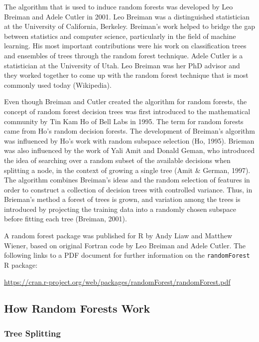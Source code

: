 \documentclass[12pt,twoside]{reedthesis}
\begin{document}
  The algorithm that is used to induce random forests was developed by Leo
  Breiman and Adele Cutler in 2001. Leo Breiman was a distinguished
  statistician at the University of California, Berkeley. Breiman's work
  helped to bridge the gap between statistics and computer science,
  particularly in the field of machine learning. His most important
  contributions were his work on classification trees and ensembles of
  trees through the random forest technique. Adele Cutler is a
  statistician at the University of Utah. Leo Breiman was her PhD advisor
  and they worked together to come up with the random forest technique
  that is most commonly used today (Wikipedia).
  
  Even though Breiman and Cutler created the algorithm for random forests,
  the concept of random forest decision trees was first introduced to the
  mathematical community by Tin Kam Ho of Bell Labs in 1995. The term for
  random forests came from Ho's random decision forests. The development
  of Breiman's algorithm was influenced by Ho's work with random subspace
  selection (Ho, 1995). Brieman was also influenced by the work of Yali
  Amit and Donald Geman, who introduced the idea of searching over a
  random subset of the available decisions when splitting a node, in the
  context of growing a single tree (Amit \& German, 1997). The algorithm
  combines Breiman's ideas and the random selection of features in order
  to construct a collection of decision trees with controlled variance.
  Thus, in Brieman's method a forest of trees is grown, and variation
  among the trees is introduced by projecting the training data into a
  randomly chosen subspace before fitting each tree (Breiman, 2001).
  
  A random forest package was published for R by Andy Liaw and Matthew
  Wiener, based on original Fortran code by Leo Breiman and Adele Cutler.
  The following links to a PDF document for further information on the
  \texttt{randomForest} R package:
  
  \url{https://cran.r-project.org/web/packages/randomForest/randomForest.pdf}
  
  \subsection{How Random Forests Work}\label{how-random-forests-work}
  
  \subsubsection{Tree Splitting}\label{tree-splitting}
  
\end{document}
